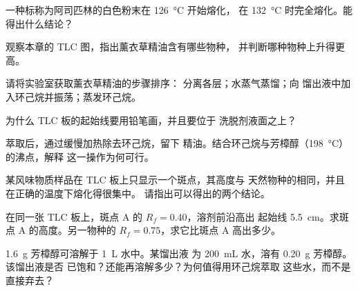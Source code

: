 \begin{exercise}[$\star\star$]\label{exo:g10:chemical-species:8}
一种标称为阿司匹林的白色粉末在 \qty{126}{\celsius} 开始熔化，
在 \qty{132}{\celsius} 时完全熔化。能得出什么结论？
\end{exercise}

\begin{exercise}[$\star\star$]\label{exo:g10:chemical-species:9}
观察本章的 TLC 图，指出薰衣草精油含有哪些物种，
并判断哪种物种上升得更高。
\end{exercise}

\begin{exercise}[$\star\star$]\label{exo:g10:chemical-species:10}
请将实验室获取薰衣草精油的步骤排序：
分离各层；水蒸气蒸馏；向
馏出液中加入环己烷并振荡；蒸发环己烷。
\end{exercise}

\begin{exercise}[$\star\star$]\label{exo:g10:chemical-species:11}
为什么 TLC 板的起始线要用铅笔画，并且要位于
洗脱剂液面之上？
\end{exercise}

\begin{exercise}[$\star\star\star$]\label{exo:g10:chemical-species:12}
萃取后，通过缓慢加热除去环己烷，留下
精油。结合环己烷与芳樟醇（\qty{198}{\celsius}）的沸点，解释
这一操作为何可行。
\end{exercise}

\begin{exercise}[$\star\star\star$]\label{exo:g10:chemical-species:13}
某风味物质样品在 TLC 板上只显示一个斑点，其高度与
天然物种的相同，并且在正确的温度下熔化得很集中。
请指出可以得出的两个结论。
\end{exercise}

\begin{exercise}[$\star\star\star$]\label{exo:g10:chemical-species:14}
在同一张 TLC 板上，斑点 A 的 $R_f = 0.40$，溶剂前沿高出
起始线 \qty{5.5}{cm}。求斑点 A 的高度。另一物种的
$R_f = 0.75$，求它比斑点 A 高出多少。
\end{exercise}

\begin{exercise}[$\star\star\star$]\label{exo:g10:chemical-species:15}
\qty{1.6}{g} 芳樟醇可溶解于 \qty{1}{L} 水中。某馏出液
为 \qty{200}{mL} 水，溶有 \qty{0.20}{g} 芳樟醇。该馏出液是否
已饱和？还能再溶解多少？为何值得用环己烷萃取
这些水，而不是直接弃去？
\end{exercise}

\clearpage %
